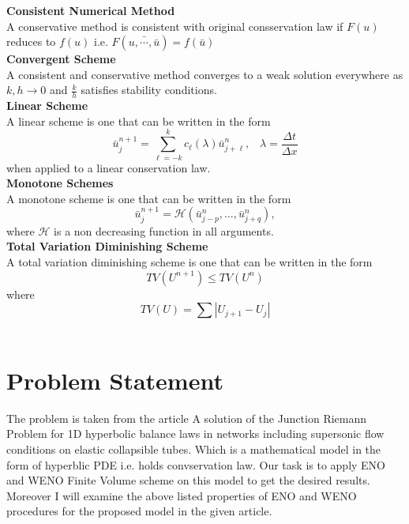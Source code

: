 \documentclass{article}
\begin{document}
\noindent \textbf{Consistent Numerical Method}\\
A conservative method is consistent with original consservation law if $F(u)$ reduces to $f(u)$ i.e. $F(\bar{u,\cdots,\bar{u}}) = f(\bar{u})$\\

\noindent \textbf{Convergent Scheme}\\
A consistent and conservative method converges to a weak solution everywhere as $k,h \longrightarrow 0$ and $\frac{k}{h}$ satisfies stability conditions.\\

\noindent \textbf{Linear Scheme}\\
A linear scheme is one that can be written in the form
\begin{equation}
\bar{u}_{j}^{n+1} = \sum_{\ell=-k}^{k} c_{\ell}(\lambda) \bar{u}_{j+\ell}^{n}, \;\;\;\lambda = \frac{\Delta t}{\Delta x}    
\end{equation}
\noindent when applied to a linear conservation law.\\

\noindent \textbf{Monotone Schemes}\\
A monotone scheme is one that can be written in the form
\begin{equation}
  \bar{u}_{j}^{n+1} = \mathcal{H}(\bar{u}_{j-p}^{n}, \dots, \bar{u}_{j+q}^{n}),
\end{equation}
\noindent where $\mathcal{H}$ is a non decreasing function in all arguments.\\

\noindent \textbf{Total Variation Diminishing Scheme}\\
A total variation diminishing scheme is one that can be written in the form
\begin{equation}
    TV(U^{n+1}) \leq TV(U^{n})
\end{equation}
\noindent where
\begin{equation}
    TV(U) = \sum |U_{j+1} - U_j|
\end{equation}
\\

\section{Problem Statement}
\noindent The problem is taken from the article A solution of the Junction Riemann Problem for 1D hyperbolic balance laws in networks including supersonic flow conditions on elastic collapsible tubes. Which is a mathematical model in the form of hyperblic PDE i.e. holds convservation law. Our task is to apply ENO and WENO Finite Volume scheme on this model to get the desired results. Moreover I will examine the above listed properties of ENO and WENO procedures for the proposed model in the given article\cite{murillo2021solution}. 
\end{document}
